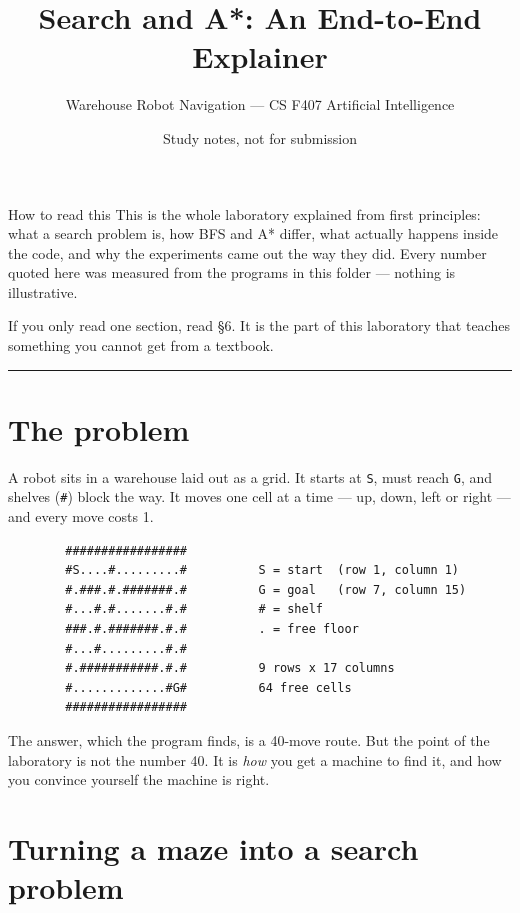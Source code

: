 \documentclass[11pt,a4paper]{article}
\title{\vspace{-1.5cm}\textbf{Search and A*: An End-to-End Explainer}}
\author{Warehouse Robot Navigation --- CS F407 Artificial Intelligence}
\date{Study notes, not for submission}
\begin{document}
\maketitle

\begin{keyidea}{How to read this}
This is the whole laboratory explained from first principles: what a search
problem is, how BFS and A* differ, what actually happens inside the code, and why
the experiments came out the way they did. Every number quoted here was measured
from the programs in this folder --- nothing is illustrative.

If you only read one section, read \S6. It is the part of this laboratory that
teaches something you cannot get from a textbook.
\end{keyidea}

\tableofcontents
\vspace{6pt}
\hrule

\section{The problem}

A robot sits in a warehouse laid out as a grid. It starts at \texttt{S}, must
reach \texttt{G}, and shelves (\texttt{\#}) block the way. It moves one cell at a
time --- up, down, left or right --- and every move costs 1.

\begin{verbatim}
        #################
        #S....#.........#          S = start  (row 1, column 1)
        #.###.#.#######.#          G = goal   (row 7, column 15)
        #...#.#.......#.#          # = shelf
        ###.#.#######.#.#          . = free floor
        #...#.........#.#
        #.###########.#.#          9 rows x 17 columns
        #.............#G#          64 free cells
        #################
\end{verbatim}

The answer, which the program finds, is a 40-move route. But the point of the
laboratory is not the number 40. It is \emph{how} you get a machine to find it,
and how you convince yourself the machine is right.

\section{Turning a maze into a search problem}
\end{document}
